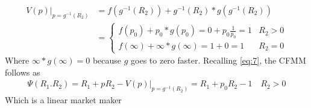 \documentclass[12pt]{article}
\begin{document}
\begin{align*}
    V(p)|_{p=g^{-1}(R_2)} & =f(g^{-1}(R_2))+g^{-1}(R_2)*g(g^{-1}(R_2))      \\
                          & =\begin{cases}
                                 f(p_0)+p_0*g(p_0)=0+p_0\frac{1}{p_0}=1 & R_2>0 \\
                                 f(\infty)+\infty*g(\infty)=1+0=1       & R_2=0
                             \end{cases}
\end{align*}
Where $\infty*g(\infty)=0$ because $g$ goes to zero faster.
\newline Recalling \eqref{eq:7}, the CFMM follows as
\begin{align*}
    \Psi(R_1.R_2) = R_1+pR_2-V(p)|_{p=g^{-1}(R_2)} = R_1 +p_0R_2 -1 \quad R_2>0
\end{align*}
Which is a linear market maker
\end{document}
